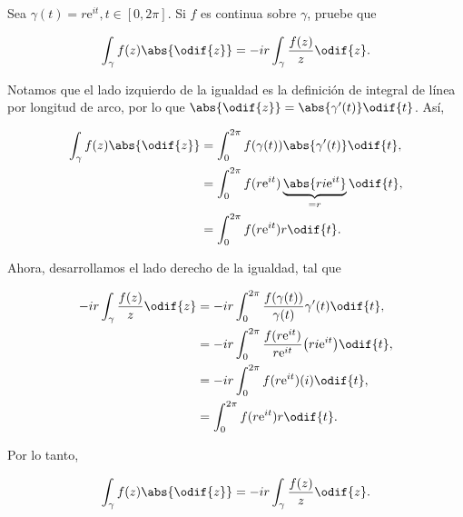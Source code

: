 \documentclass[../main.tex]{subfiles}
\begin{document}
\begin{problema}
    Sea \(\gamma(t) = r \mathrm{e}^{it}, t\in [0, 2\pi]\). Si \(f\) es continua sobre
    \(\gamma\), pruebe que

    \begin{equation*}
        \int_{\gamma}^{}f(z)\abs{\odif{z}} = -ir
        \int_{\gamma}^{}\dfrac{f(z)}{z}\odif{z}.
    \end{equation*}
\end{problema}

\startsolution

Notamos que el lado izquierdo de la igualdad es la definición de integral de línea por
longitud de arco, por lo que \(\abs{\odif{z}} = \abs{\gamma^{\prime}(t)}\odif{t}\). Así,

\begin{align*}
    \int_{\gamma}^{}f(z)\abs{\odif{z}} &=
    \int_{0}^{2\pi}f(\gamma(t))\abs{\gamma^{\prime}(t)}\odif{t},\nonumber\\
    &= \int_{0}^{2\pi}f(r \mathrm{e}^{it})\underbrace{\abs{ri
    \mathrm{e}^{it}}}_{= r}\odif{t},\nonumber\\
    &= \int_{0}^{2\pi}f(r \mathrm{e}^{it})r\odif{t}.
\end{align*}

Ahora, desarrollamos el lado derecho de la igualdad, tal que

\begin{align*}
    -ir \int_{\gamma}^{}\dfrac{f(z)}{z}\odif{z} &= -ir
    \int_{0}^{2\pi}\dfrac{f(\gamma(t))}{\gamma(t)}\gamma^{\prime}(t)\odif{t},\\
    &= -ir \int_{0}^{2\pi}\dfrac{f(r \mathrm{e}^{it})}{r \mathrm{e}^{it}}\bigl(ri
    \mathrm{e}^{it}\bigr)\odif{t},\\
    &= -ir \int_{0}^{2\pi}f(r \mathrm{e}^{it})(i)\odif{t},\\
    &= \int_{0}^{2\pi}f(r \mathrm{e}^{it})r\odif{t}.
\end{align*}

Por lo tanto,

\begin{equation*}
    \int_{\gamma}^{}f(z)\abs{\odif{z}} = -ir
    \int_{\gamma}^{}\dfrac{f(z)}{z}\odif{z}.
\end{equation*}
\end{document}
